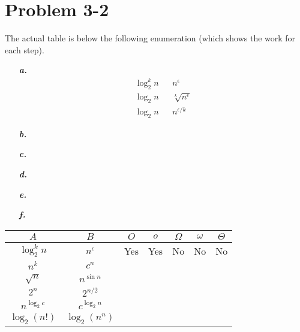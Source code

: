 \documentclass{article}
\begin{document}
\section*{Problem 3-2}

The actual table is below the following enumeration (which shows the work for each step).

\noindent\begin{enumerate}
	\item[\textbf{\textit{a.}}]
		\begin{eqnarray*}
			\log_2 ^k n & & n^\epsilon \\
			\log_2 n & & \sqrt[k]{n^\epsilon} \\
			\log_2 n & & n^{\epsilon / k}
		\end{eqnarray*}
	\item[\textbf{\textit{b.}}]
	\item[\textbf{\textit{c.}}]
	\item[\textbf{\textit{d.}}]
	\item[\textbf{\textit{e.}}]
	\item[\textbf{\textit{f.}}]
\end{enumerate}

\noindent\begin{tabular}{c c|c|c|c|c|c|}
	$A$ & $B$ & $O$ & $o$ & $\Omega$ & $\omega$ & $\Theta$ \\ \hline
	$\log_2 ^k n$ & $n^\epsilon$ & Yes & Yes & No & No & No \\ \hline
	$n^k$ & $c^n$ & & & & & \\ \hline
	$\sqrt{n}$ & $n^{\sin n}$ & & & & & \\ \hline
	$2^n$ & $2^{n / 2}$ & & & & & \\ \hline
	$n^{\log_2 c}$ & $c^{\log_2 n}$ & & & & & \\ \hline
	$\log_2 (n!)$ & $\log_2 (n^n)$ & & & & & \\ \hline
\end{tabular}
\end{document}
